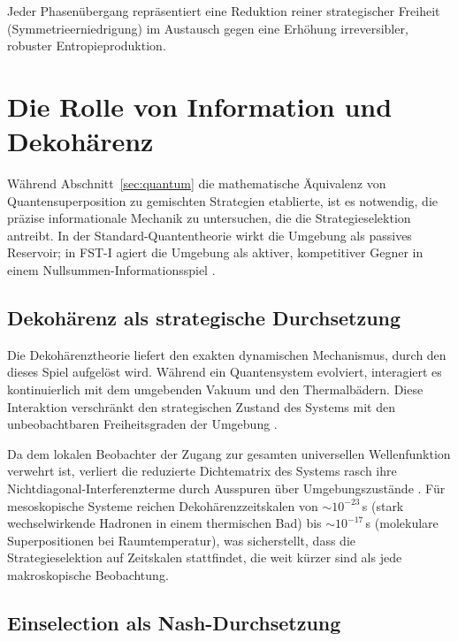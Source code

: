 \documentclass[12pt,a4paper]{article}
\theoremstyle{remark}
\begin{document}
Jeder Phasen\"ubergang repr\"asentiert eine Reduktion reiner strategischer Freiheit (Symmetrieerniedrigung) im Austausch gegen eine Erh\"ohung irreversibler, robuster Entropieproduktion.

\section{Die Rolle von Information und Dekoh\"arenz}
\label{sec:decoherence}

W\"ahrend Abschnitt~\ref{sec:quantum} die mathematische \"Aquivalenz von Quantensuperposition zu gemischten Strategien etablierte, ist es notwendig, die pr\"azise informationale Mechanik zu untersuchen, die die Strategieselektion antreibt. In der Standard-Quantentheorie wirkt die Umgebung als passives Reservoir; in FST-I agiert die Umgebung als aktiver, kompetitiver Gegner in einem Nullsummen-Informationsspiel \citep{ValentiniWestman2005}.

\subsection{Dekoh\"arenz als strategische Durchsetzung}

Die Dekoh\"arenztheorie liefert den exakten dynamischen Mechanismus, durch den dieses Spiel aufgel\"ost wird. W\"ahrend ein Quantensystem evolviert, interagiert es kontinuierlich mit dem umgebenden Vakuum und den Thermalb\"adern. Diese Interaktion verschr\"ankt den strategischen Zustand des Systems mit den unbeobachtbaren Freiheitsgraden der Umgebung \citep{MeasurementClassical}.

Da dem lokalen Beobachter der Zugang zur gesamten universellen Wellenfunktion verwehrt ist, verliert die reduzierte Dichtematrix des Systems rasch ihre Nichtdiagonal-Interferenzterme durch Ausspuren \"uber Umgebungszust\"ande \citep{Lindblad1976}. F\"ur mesoskopische Systeme reichen Dekoh\"arenzzeitskalen von ${\sim}10^{-23}\,$s (stark wechselwirkende Hadronen in einem thermischen Bad) bis ${\sim}10^{-17}\,$s (molekulare Superpositionen bei Raumtemperatur), was sicherstellt, dass die Strategieselektion auf Zeitskalen stattfindet, die weit k\"urzer sind als jede makroskopische Beobachtung.

\subsection{Einselection als Nash-Durchsetzung}
\end{document}
